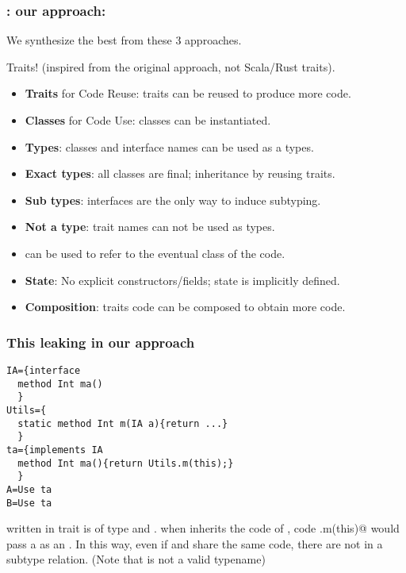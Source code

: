 \begin{frame}[fragile]
\frametitle{\name: our approach:}
We synthesize the best from these 3 approaches.

Traits! (inspired from the original approach, not Scala/Rust traits).

\begin{itemize}
\item \textbf{Traits} for Code Reuse: traits can be reused to produce more code.
\item \textbf{Classes} for Code Use: classes can be instantiated.
\item \textbf{Types}: classes and interface names can be used as a types.
\item \textbf{Exact types}: all classes are final; inheritance by reusing traits.
\item \textbf{Sub types}: interfaces are the only way to induce subtyping.
\item \textbf{Not a type}: trait names can not be used as types.
\item[] \Q@This@ can be used to refer to the eventual class of the code.
\item \textbf{State}: No explicit constructors/fields; state is implicitly defined.
\item \textbf{Composition}: traits code can be composed to obtain more code.
\end{itemize}


\end{frame}


\begin{frame}[fragile]
\frametitle{This leaking in our approach}

\begin{lstlisting}
IA={interface
  method Int ma()
  }
Utils={
  static method Int m(IA a){return ...} 
  }
ta={implements IA
  method Int ma(){return Utils.m(this);}
  }
A=Use ta
B=Use ta
\end{lstlisting}

\Q@this@ written in trait \Q@ta@ is of type \Q@This@ and \Q@IA@.
when \Q@B@ inherits the code of \Q@ta@,
code \Q@Uitls.m(this)@ would pass a \Q@this@
as an \Q@IA@. In this way, even if
\Q@B@ and \Q@A@ share the same code, there
are not in a subtype relation.
(Note that \Q@ta@ is not a valid typename)
\end{frame}

